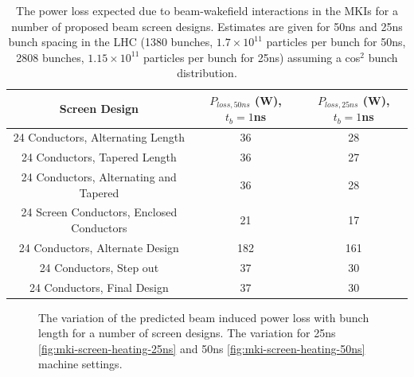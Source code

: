 \begin{table}
\label{tab:heating-mki-screen-designs}
\caption{The power loss expected due to beam-wakefield interactions in the MKIs for a number of proposed beam screen designs. Estimates are given for 50ns and 25ns bunch spacing in the LHC (1380 bunches, $1.7 \times 10^{11}$ particles per bunch for 50ns, 2808 bunches, $1.15 \times 10^{11}$ particles per bunch for 25ns) assuming a cos$^{2}$ bunch distribution.}
\begin{center}
\begin{tabular}{c | c | c}
Screen Design & $P_{loss,50ns}$ (W), $t_{b}=1$ns & $P_{loss,25ns}$ (W), $t_{b}=1$ns \\ \hline 
24 Conductors, Alternating Length & 36 & 28 \\ \hline %
24 Conductors, Tapered Length & 36 & 27 \\ \hline %
24 Conductors, Alternating and Tapered & 36 & 28 \\ \hline %
24 Screen Conductors, Enclosed Conductors & 21 & 17 \\ \hline %
24 Conductors, Alternate Design & 182 & 161 \\ \hline %
24 Conductors, Step out & 37 & 30 \\ \hline %
24 Conductors, Final Design & 37 & 30 \\ %
\end{tabular}
\end{center}
\end{table}

\begin{figure}
\label{fig:mki-screens-heating-bunch-length}
\caption{The variation of the predicted beam induced power loss with bunch length for a number of screen designs. The variation for 25ns \ref{fig:mki-screen-heating-25ns} and 50ns \ref{fig:mki-screen-heating-50ns} machine settings.}
\end{figure}
